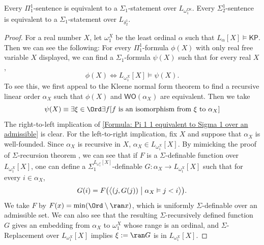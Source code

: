 \documentclass{mhkr}
\newcommand{\added}[1]{#1}
\newcommand{\lag}{\langle}
\newcommand{\rag}{\rangle}
\newcommand{\WO}{\mathsf{WO}}
\newcommand{\CK}{\mathsf{CK}}
\newcommand{\KP}{\mathsf{KP}}
\begin{document}
\begin{proposition} \label{Proposition: Reducing Pi 1 1 and Sigma 1 2 into L} 
    Every $\Pi^1_1$-sentence is equivalent to a $\Sigma_1$-statement over $L_{\omega_1^\CK}$. Every $\Sigma^1_2$-sentence is equivalent to a $\Sigma_1$-statement over $L_{\delta^1_2}$. 
\end{proposition}
\begin{proof}\added{
    For a real number $X$, let $\omega_1^X$ be the least ordinal $\alpha$ such that $L_\alpha[X]\vDash \KP$. Then we can see the following: For every $\Pi^1_1$-formula $\phi(X)$ with only real free variable $X$ displayed, we can find a $\Sigma_1$-formula $\psi(X)$ such that for every real $X$,
    \begin{equation} \label{Formula: Pi 1 1 equivalent to Sigma 1 over an admissible}
        \phi(X) \iff L_{\omega_1^X}[X]\vDash \psi(X).
    \end{equation}
    To see this, we first appeal to the Kleene normal form theorem to find a recursive linear order $\alpha_X$ such that $\phi(X)$ and $\WO(\alpha_X)$ are equivalent. Then we take
    \begin{equation*}
        \psi(X) \equiv \exists \xi\in \Ord \exists f [\text{$f$ is an isomorphism from $\xi$ to $\alpha_X$}]
    \end{equation*}
    The right-to-left implication of \eqref{Formula: Pi 1 1 equivalent to Sigma 1 over an admissible} is clear. For the left-to-right implication, fix $X$ and suppose that $\alpha_X$ is well-founded. Since $\alpha_X$ is recursive in $X$, $\alpha_X \in L_{\omega_1^X}[X]$. 
    By mimicking the proof of $\Sigma$-recursion theorem \cite[Theorem I.6.4]{Barwise1975}, we can see that if $F$ is a $\Sigma$-definable function over $L_{\omega_1^X}[X]$, one can define a $\Sigma_1^{L_{\omega_1^x}[X]}$-definable $G\colon \alpha_X\to L_{\omega_1^X}[X]$ such that for every $i\in \alpha_X$,
    \begin{equation*}
        G(i) = F\bigl(\bigl\lag (j,G(j)) \bigm| \alpha_X\vDash j<i\bigr\rag\bigr).
    \end{equation*}
    We take $F$ by $F(x) = \min (\Ord \setminus \ran x)$, which is uniformly $\Sigma$-definable over an admissible set. We can also see that the resulting $\Sigma$-recursively defined function $G$ gives an embedding from $\alpha_X$ to $\omega_1^X$ whose range is an ordinal, and $\Sigma$-Replacement over $L_{\omega_1^X}[X]$ implies $\xi:=\ran G$ is in $L_{\omega_1^X}[X]$. 
    
}
\end{proof}
\end{document}
